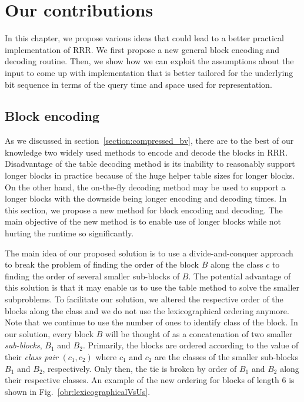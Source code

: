 \chapter{Our contributions}
\label{kap:kap3}

In this chapter, we propose various ideas that could lead to a better practical
implementation of RRR. We first propose a new general block encoding and decoding routine.
Then, we show how we can exploit the assumptions about the input to come up with
implementation that is better tailored for the underlying bit sequence in terms of
the query time and space used for representation.

\section{Block encoding}

As we discussed in section~\ref{section:compressed_bv}, there are to
the best of our knowledge two widely used methods to encode and decode the
blocks in RRR. Disadvantage of the table decoding method is its inability
to reasonably support longer blocks in practice because of the
huge helper table sizes for longer blocks. On the other hand, the on-the-fly
decoding method may be used to support a longer blocks with the downside
being longer encoding and decoding times. In this section, we propose a new
method for block encoding and decoding. The main objective of the new
method is to enable use of longer blocks while not hurting the runtime so significantly.

The main idea of our proposed solution is to use a divide-and-conquer approach to
break the problem of finding the order of the block $B$ along the class $c$ to
finding the order of several smaller sub-blocks of $B$. The potential advantage of this
solution is that it may enable us to use the table method to solve the smaller
subproblems. To facilitate our solution, we altered the respective order of the blocks
along the class and we do not use the lexicographical ordering anymore. Note that we
continue to use the number of ones to identify class of the block. In our solution, every
block $B$ will be thought of as a concatenation of two smaller \textit{sub-blocks}, $B_1$
and $B_2$. Primarily, the blocks are ordered according to the value of their \textit{class pair}
$(c_1, c_2)$ where $c_1$ and $c_2$ are the classes of the smaller sub-blocks $B_1$ and $B_2$,
respectively. Only then, the tie is broken by order of $B_1$ and $B_2$ along their respective
classes. An example of the new ordering for blocks of length 6 is shown in Fig.~\ref{obr:lexicographicalVsUs}.

